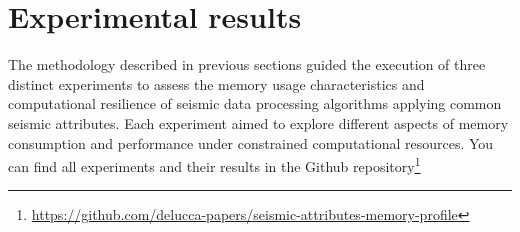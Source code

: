 \section{Experimental results}

The methodology described in previous sections guided the execution of three distinct experiments to assess the memory usage characteristics and computational resilience of seismic data processing algorithms applying common seismic attributes.
Each experiment aimed to explore different aspects of memory consumption and performance under constrained computational resources.
You can find all experiments and their results in the Github repository\footnote{\url{https://github.com/delucca-papers/seismic-attributes-memory-profile}}




